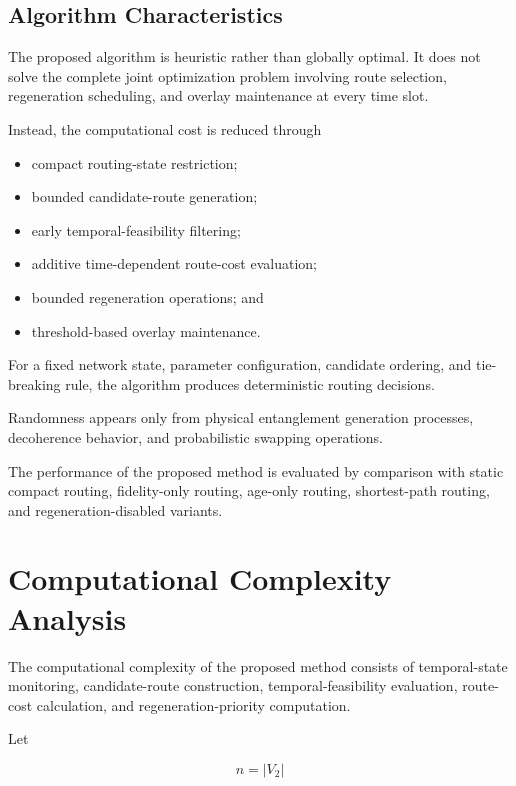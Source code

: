 \subsection{Algorithm Characteristics}

The proposed algorithm is heuristic rather than globally optimal. It does not solve the complete joint optimization problem involving route selection, regeneration scheduling, and overlay maintenance at every time slot.

Instead, the computational cost is reduced through

\begin{itemize}
    \item compact routing-state restriction;
    \item bounded candidate-route generation;
    \item early temporal-feasibility filtering;
    \item additive time-dependent route-cost evaluation;
    \item bounded regeneration operations; and
    \item threshold-based overlay maintenance.
\end{itemize}

For a fixed network state, parameter configuration, candidate ordering, and tie-breaking rule, the algorithm produces deterministic routing decisions.

Randomness appears only from physical entanglement generation processes, decoherence behavior, and probabilistic swapping operations.

The performance of the proposed method is evaluated by comparison with static compact routing, fidelity-only routing, age-only routing, shortest-path routing, and regeneration-disabled variants.


\section{Computational Complexity Analysis}

The computational complexity of the proposed method consists of temporal-state monitoring, candidate-route construction, temporal-feasibility evaluation, route-cost calculation, and regeneration-priority computation.

Let

\begin{equation}
    n
    =
    |V_2|
\end{equation}

